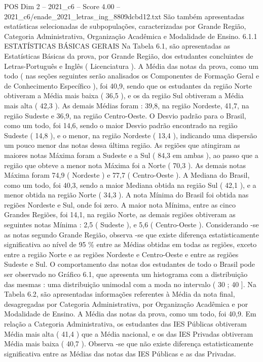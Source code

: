 \begin{textsample}{POS Dim 2 – 2021\_c6 – Score 4.00 – 2021\_c6/enade\_2021\_letras\_ing\_8809dcbd12.txt}
São também apresentadas estatísticas selecionadas de subpopulações, caracterizadas por Grande Região, Categoria Administrativa, Organização Acadêmica e Modalidade de Ensino. 6.1.1 ESTATÍSTICAS BÁSICAS GERAIS Na Tabela 6.1, são apresentadas as Estatísticas Básicas da prova, por Grande Região, dos estudantes concluintes de Letras-Português e Inglês ( Licenciatura ).
A Média das notas da prova, como um todo ( nas seções seguintes serão analisados os Componentes de Formação Geral e de Conhecimento Específico ), foi 40,9, sendo que os estudantes da região Norte obtiveram a Média mais baixa ( 36,5 ), e os da região Sul obtiveram a Média mais alta ( 42,3 ).
As demais Médias foram : 39,8, na região Nordeste, 41,7, na região Sudeste e 36,9, na região Centro-Oeste.
O Desvio padrão para o Brasil, como um todo, foi 14,6, sendo o maior Desvio padrão encontrado na região Sudeste ( 14,8 ), e o menor, na região Nordeste ( 13,4 ), indicando uma dispersão um pouco menor das notas dessa última região.
As regiões que atingiram as maiores notas Máxima foram a Sudeste e a Sul ( 84,3 em ambas ), ao passo que a região que obteve a menor nota Máxima foi a Norte ( 70,3 ).
As demais notas Máxima foram 74,9 ( Nordeste ) e 77,7 ( Centro-Oeste ).
A Mediana do Brasil, como um todo, foi 40,3, sendo a maior Mediana obtida na região Sul ( 42,1 ), e a menor obtida na região Norte ( 34,3 ).
A nota Mínima do Brasil foi obtida nas regiões Nordeste e Sul, onde foi zero.
A maior nota Mínima, entre as cinco Grandes Regiões, foi 14,1, na região Norte, as demais regiões obtiveram as seguintes notas Mínima : 2,5 ( Sudeste ), e 5,6 ( Centro-Oeste ).
Considerando -se as notas segundo Grande Região, observa -se que existe diferença estatisticamente significativa ao nível de 95 \% entre as Médias obtidas em todas as regiões, exceto entre a região Norte e as regiões Nordeste e Centro-Oeste e entre as regiões Sudeste e Sul.
O comportamento das notas dos estudantes de todo o Brasil pode ser observado no Gráfico 6.1, que apresenta um histograma com a distribuição das mesmas : uma distribuição unimodal com a moda no intervalo ( 30 ; 40 ].
Na Tabela 6.2, são apresentadas informações referentes à Média da nota final, desagregadas por Categoria Administrativa, por Organização Acadêmica e por Modalidade de Ensino.
A Média das notas da prova, como um todo, foi 40,9.
Em relação a Categoria Administrativa, os estudantes das IES Públicas obtiveram Média mais alta ( 41,4 ) que a Média nacional, e os das IES Privadas obtiveram Média mais baixa ( 40,7 ).
Observa -se que não existe diferença estatisticamente significativa entre as Médias das notas das IES Públicas e as das Privadas.

\end{textsample}
